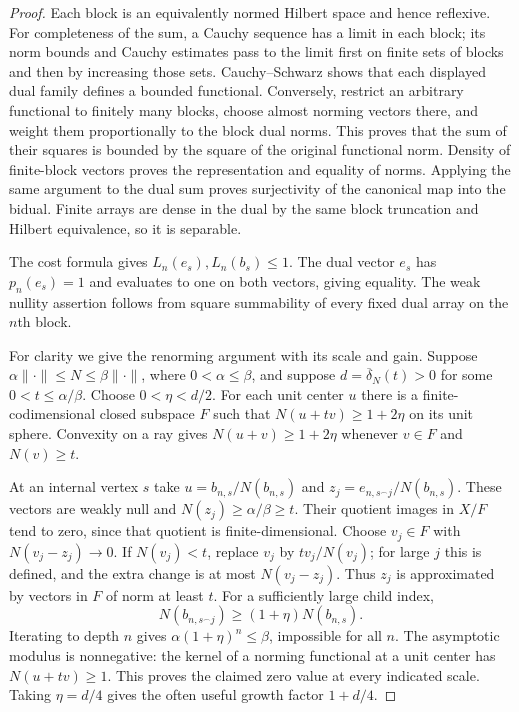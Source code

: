 \begin{proof}
Each block is an equivalently normed Hilbert space and hence reflexive.
For completeness of the sum, a Cauchy sequence has a limit in each
block; its norm bounds and Cauchy estimates pass to the limit first on
finite sets of blocks and then by increasing those sets.  Cauchy--Schwarz
shows that each displayed dual family defines a bounded functional.
Conversely, restrict an arbitrary functional to finitely many blocks,
choose almost norming vectors there, and weight them proportionally to
the block dual norms.  This proves that the sum of their squares is
bounded by the square of the original functional norm.  Density of
finite-block vectors proves the representation and equality of norms.
Applying the same argument to the dual sum proves surjectivity of the
canonical map into the bidual.  Finite arrays are dense in the dual
by the same block truncation and Hilbert equivalence, so it is separable.

The cost formula gives $L_n(e_s),L_n(b_s)\le1$.  The dual vector $e_s$
has $p_n(e_s)=1$ and evaluates to one on both vectors, giving equality.
The weak nullity assertion follows from square summability of every
fixed dual array on the $n$th block.

For clarity we give the renorming argument with its scale and gain.
Suppose $\alpha\|\cdot\|\le N\le\beta\|\cdot\|$, where
$0<\alpha\le\beta$, and suppose $d=\overline\delta_N(t)>0$ for
some $0<t\le\alpha/\beta$.  Choose $0<\eta<d/2$.
For each unit center $u$ there is a finite-codimensional closed
subspace $F$ such that $N(u+tv)\ge1+2\eta$ on its unit sphere.
Convexity on a ray gives $N(u+v)\ge1+2\eta$ whenever $v\in F$
and $N(v)\ge t$.

At an internal vertex $s$ take
$u=b_{n,s}/N(b_{n,s})$ and
$z_j=e_{n,s^\frown j}/N(b_{n,s})$.  These vectors are weakly null and
$N(z_j)\ge\alpha/\beta\ge t$.  Their quotient images in $X/F$
tend to zero, since that quotient is finite-dimensional.  Choose
$v_j\in F$ with $N(v_j-z_j)\to0$.  If $N(v_j)<t$, replace $v_j$
by $tv_j/N(v_j)$; for large $j$ this is defined, and the extra change
is at most $N(v_j-z_j)$.  Thus $z_j$ is approximated by vectors in
$F$ of norm at least $t$.  For a sufficiently large child index,
\[
 N(b_{n,s^\frown j})\ge(1+\eta)N(b_{n,s}).
\]
Iterating to depth $n$ gives $\alpha(1+\eta)^n\le\beta$, impossible
for all $n$.  The asymptotic modulus is nonnegative: the kernel of a
norming functional at a unit center has $N(u+tv)\ge1$.
This proves the claimed zero value at every indicated scale.  Taking
$\eta=d/4$ gives the often useful growth factor $1+d/4$.
\end{proof}

